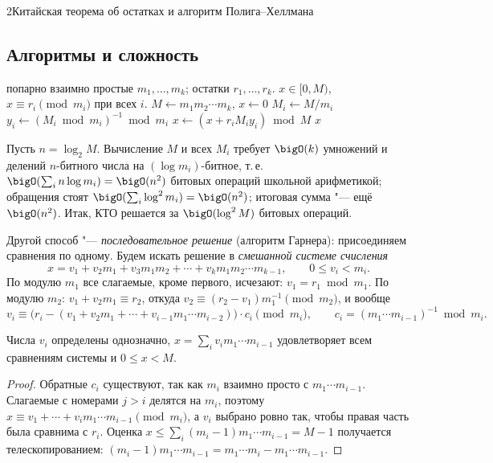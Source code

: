 \begin{lecture}{2}{Китайская теорема об остатках и алгоритм Полига–Хеллмана}

\subsection{Алгоритмы и сложность}

\begin{algorithm}\label{l2:alg-crt}
\begin{algorithmic}[1]
\Require попарно взаимно простые $m_1, \dots, m_k$; остатки $r_1, \dots, r_k$.
\Ensure $x \in [0, M)$, $x \equiv r_i \pmod{m_i}$ при всех $i$.
\State $M \gets m_1 m_2 \cdots m_k$, \quad $x \gets 0$
  \State $M_i \gets M / m_i$
  \State $y_i \gets (M_i \bmod m_i)^{-1} \bmod m_i$ 
  \State $x \gets (x + r_i M_i y_i) \bmod M$
\EndFor
\State \Return $x$
\end{algorithmic}
\end{algorithm}

Пусть $n = \log_2 M$. Вычисление $M$ и всех $M_i$ требует $\bigO(k)$ умножений и делений
$n$-битного числа на $(\log m_i)$-битное, т.\,е. $\bigO(\sum_i n \log m_i) = \bigO(n^2)$ битовых
операций школьной арифметикой; обращения стоят $\bigO(\sum_i \log^2 m_i) = \bigO(n^2)$;
итоговая сумма "--- ещё $\bigO(n^2)$. Итак, КТО решается за $\bigO(\log^2 M)$ битовых операций.

Другой способ "--- \emph{последовательное решение} (алгоритм Гарнера): присоединяем сравнения по
одному. Будем искать решение в \emph{смешанной системе счисления}
\[
  x = v_1 + v_2 m_1 + v_3 m_1 m_2 + \cdots + v_k m_1 m_2 \cdots m_{k-1}, \qquad 0 \le v_i < m_i.
\]
По модулю $m_1$ все слагаемые, кроме первого, исчезают: $v_1 = r_1 \bmod m_1$. По модулю $m_2$:
$v_1 + v_2 m_1 \equiv r_2$, откуда $v_2 \equiv (r_2 - v_1) m_1^{-1} \pmod{m_2}$, и вообще
\[
  v_i \equiv \bigl(r_i - (v_1 + v_2 m_1 + \cdots + v_{i-1} m_1 \cdots m_{i-2})\bigr)\cdot
  c_i \pmod{m_i}, \qquad c_i = (m_1 \cdots m_{i-1})^{-1} \bmod m_i .
\]

\begin{proposition}\label{l2:garner}
Числа $v_i$ определены однозначно, $x = \sum_i v_i m_1 \cdots m_{i-1}$ удовлетворяет всем
сравнениям системы и $0 \le x < M$.
\end{proposition}

\begin{proof}
Обратные $c_i$ существуют, так как $m_i$ взаимно просто с $m_1 \cdots m_{i-1}$. Слагаемые с номерами
$j > i$ делятся на $m_i$, поэтому $x \equiv v_1 + \cdots + v_i m_1 \cdots m_{i-1} \pmod{m_i}$,
а $v_i$ выбрано ровно так, чтобы правая часть была сравнима с $r_i$. Оценка
$x \le \sum_i (m_i - 1) m_1 \cdots m_{i-1} = M - 1$ получается телескопированием:
$(m_i - 1) m_1 \cdots m_{i-1} = m_1 \cdots m_i - m_1 \cdots m_{i-1}$.
\end{proof}


\end{lecture}
